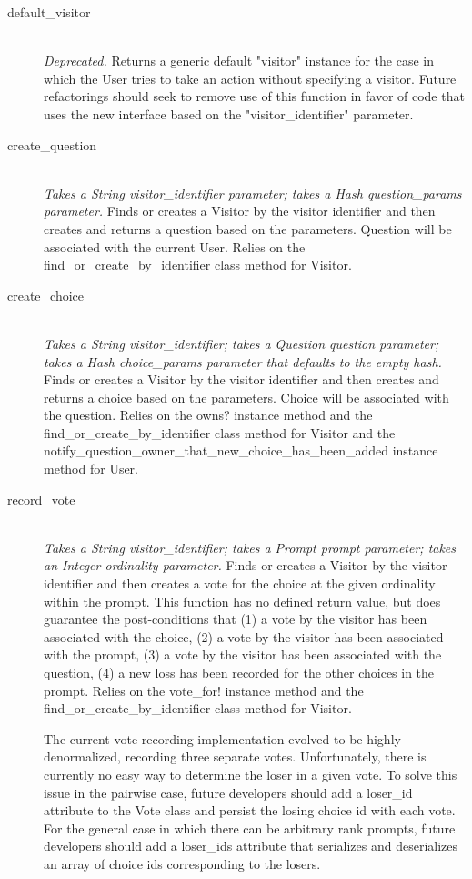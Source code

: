 \documentclass[11pt]{book}
\begin{document}
\begin{description}
	\item[default\_visitor]  \hfill \\
  \emph{Deprecated.}  Returns a generic default "visitor" instance for the case in which the User tries to take an action without specifying a visitor.  Future refactorings should seek to remove use of this function in favor of code that uses the new interface based on the "visitor\_identifier" parameter.

  \item[create\_question]  \hfill \\
  \emph{Takes a String visitor\_identifier parameter; takes a Hash question\_params parameter. }  Finds or creates a Visitor by the visitor identifier and then creates and returns a question based on the parameters.  Question will be associated with the current User.  Relies on the find\_or\_create\_by\_identifier class method for Visitor.
  
  \item[create\_choice]  \hfill \\
  \emph{Takes a String visitor\_identifier; takes a Question question parameter; takes a Hash choice\_params parameter that defaults to the empty hash.}  Finds or creates a Visitor by the visitor identifier and then creates and returns a choice based on the parameters.  Choice will be associated with the question.  Relies on the owns? instance method and the find\_or\_create\_by\_identifier class method for Visitor and the notify\_question\_owner\_that\_new\_choice\_has\_been\_added instance method for User.
  
  \item[record\_vote]  \hfill \\
  \emph{Takes a String visitor\_identifier; takes a Prompt prompt parameter; takes an Integer ordinality parameter.}  Finds or creates a Visitor by the visitor identifier and then creates a vote for the choice at the given ordinality within the prompt.  This function has no defined return value, but does guarantee the post-conditions that (1) a vote by the visitor has been associated with the choice, (2) a vote by the visitor has been associated with the prompt, (3) a vote by the visitor has been associated with the question, (4) a new loss has been recorded for the other choices in the prompt.  Relies on the vote\_for! instance method and the find\_or\_create\_by\_identifier class method for Visitor.
  
  The current vote recording implementation evolved to be highly denormalized, recording three separate votes.  Unfortunately, there is currently no easy way to determine the loser in a given vote.  To solve this issue in the pairwise case, future developers should add a loser\_id attribute to the Vote class and persist the losing choice id with each vote.  For the general case in which there can be arbitrary rank prompts, future developers should add a loser\_ids attribute that serializes and deserializes an array of choice ids corresponding to the losers.
  

\end{description}
\end{document}
